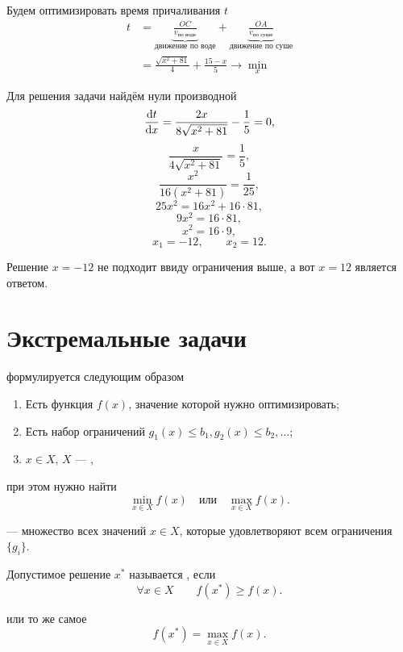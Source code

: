 \bigskip

\solution

Будем оптимизировать время причаливания $t$
\begin{align*}
	t &= \underbrace{\frac{OC}{v_{\text{по воде}}}}_{\text{движение по воде}} + \underbrace{\frac{OA}{v_{\text{по суше}}}}_{\text{движение по суше}} \\
	&= \boxed{\frac{\sqrt{x^2+81}}{4} + \frac{15 - x}{5} \to \min_x}
\end{align*}

Для решения задачи найдём нули производной
\[\derivative{t}{x} = \frac{2x}{8\sqrt{x^2+81}} - \frac{1}{5} = 0,\]
\[\frac{x}{4\sqrt{x^2+81}} = \frac{1}{5},\]
\[\frac{x^2}{16(x^2 + 81)} = \frac{1}{25},\]
\[25x^2 = 16x^2 + 16 \cdot 81,\]
\[9x^2 = 16 \cdot 81,\]
\[x^2 = 16 \cdot 9,\]
\[x_1 = -12, \qquad x_2 = 12.\]

Решение $x = -12$ не подходит ввиду ограничения выше, а вот $\boxed{x = 12}$ является ответом.

\section{Экстремальные задачи}


 формулируется следующим образом

\begin{enumerate}[nosep]
	\item Есть функция $f(x)$, значение которой нужно оптимизировать;
	
	\item Есть набор ограничений $g_1(x) \le b_1, g_2(x) \le b_2, \dots$;
	
	\item $x \in X$, $X$ --- ,
\end{enumerate}

при этом нужно найти
\[\min_{x \in X} f(x) \quad \text{или} \quad \max_{x \in X} f(x).\]


 --- множество всех значений $x \in X$, которые удовлетворяют всем ограничения $\{g_i\}$.


Допустимое решение $x^*$ называется , если
\[\forall x \in X \qquad f(x^*) \ge f(x).\]

или то же самое
\[f(x^*) = \max_{x \in X} f(x).\]

